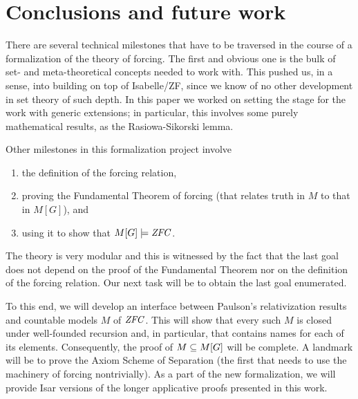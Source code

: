 \section{Conclusions and future work}
There are several technical milestones that have to be traversed in the
course of a formalization of the theory of forcing. The first and
obvious one is the bulk of set- and meta-theoretical concepts needed to work
with. This pushed us, in a sense,  into building on top of Isabelle/ZF,
since we know of no other development in set theory of such
depth. In this paper we worked on setting the stage for the work with
generic extensions; in particular, this involves some purely mathematical
results, as the Rasiowa-Sikorski lemma. 

Other milestones in this formalization project
involve 
\begin{enumerate}
\item the definition
  of the forcing relation, 
\item proving the Fundamental Theorem of forcing
  (that relates truth in $M$ to that in $M[G]$), and 
\item using it to show
  that $M[G]\models \mathit{ZFC}$. 
\end{enumerate}
The theory is very modular and this is
witnessed by the fact 
that the last goal does not depend on the proof of the Fundamental
Theorem nor on the definition of the forcing relation. Our next task
will be to obtain the last goal enumerated. 

To this end, we will develop  an interface between Paulson's
relativization results and countable models $M$ of $\mathit{ZFC}$. This will show
that every such $M$ is closed under well-founded recursion and, in
particular, that contains names for each of its
elements. Consequently, the proof of  $M\subseteq M[G]$ will be
complete. A landmark will be to prove the Axiom Scheme
of Separation (the first that needs to use the machinery of forcing
nontrivially). As a part of the new formalization, we will provide
Isar versions of the longer applicative proofs presented in this work.

